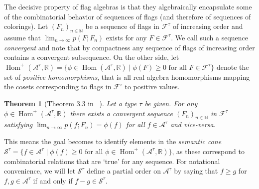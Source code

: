 \documentclass[a4paper,11pt]{article}
\newtheorem{theorem}{Theorem}[section]
\numberwithin{equation}{section}
\newcommand{\mA}{\mathcal{A}}
\newcommand{\mF}{\mathcal{F}}
\newcommand{\mS}{\mathcal{S}}
\newcommand{\RR}{\mathbb{R}}
\newcommand{\NN}{\mathbb{N}}
\begin{document}

The decisive property of flag algebras is that they algebraically encapsulate some of the combinatorial behavior of sequences of flags (and therefore of sequences of colorings). Let $(F_n)_{n \in \NN}$ be a sequence of flags in $\mF^\tau$ of increasing order and assume that $\lim_{n \to \infty} p(F; F_n)$ exists for any $F \in \mF^\tau$. We call such a sequence \emph{convergent} and note that by compactness any sequence of flags of increasing order contains a convergent subsequence. On the other side, let $\operatorname{Hom}^+(\mA^\tau, \RR) = \{\phi \in \operatorname{Hom} (\mA^\tau, \RR) \mid \phi(F) \geq 0 \text{ for all } F \in \mF^\tau \}$ denote the set of \emph{positive homomorphisms}, that is all real algebra homomorphisms mapping the cosets corresponding to flags in $\mF^\tau$ to positive values.
%
\begin{theorem}[Theorem 3.3 in ~\cite{Razborov_2007}] \label{thm:homfunctional}
    Let a type $\tau$ be given. For any $\phi \in \operatorname{Hom}^+(\mA^\tau, \RR)$ there exists a convergent sequence $(F_n)_{n \in \NN}$ in $\mF^\tau$ satisfying $\lim_{n \to \infty} p(f; F_n) = \phi(f)$ for all $f \in \mA^\tau$ and vice-versa.
\end{theorem}
%
This means the goal becomes to identify elements in the \emph{semantic cone} $\mS^\tau = \{f \in \mA^\tau \mid \phi(f) \geq 0 \text{ for all } \phi \in \operatorname{Hom}^+(\mA^\tau, \RR)\}$, as these correspond to combinatorial relations that are {\lq}true{\rq} for any sequence. 
For notational convenience, we will let $\mS^\tau$ define a partial order on $\mA^\tau$ by saying that $f \geq g$ for $f, g \in \mA^\tau$ if and only if $f - g \in \mS^\tau$. 
\end{document}
